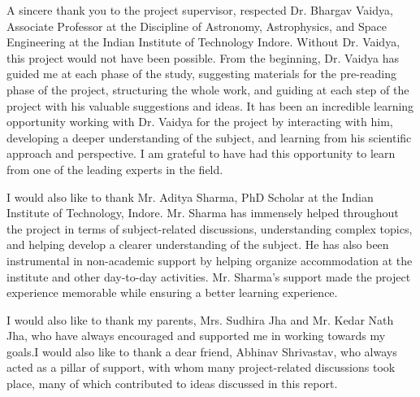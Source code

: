 \documentclass{article}
\begin{document}
A sincere thank you to the project supervisor, respected Dr. Bhargav Vaidya, Associate Professor at the Discipline of Astronomy, Astrophysics, and Space Engineering at the Indian Institute of Technology Indore. Without Dr. Vaidya, this project would not have been possible. From the beginning, Dr. Vaidya has guided me at each phase of the study, suggesting materials for the pre-reading phase of the project, structuring the whole work, and guiding at each step of the project with his valuable suggestions and ideas. It has been an incredible learning opportunity working with Dr. Vaidya for the project by interacting with him, developing a deeper understanding of the subject, and learning from his scientific approach and perspective. I am grateful to have had this opportunity to learn from one of the leading experts in the field.

I would also like to thank Mr. Aditya Sharma, PhD Scholar at the Indian Institute of Technology, Indore. Mr. Sharma has immensely helped throughout the project in terms of subject-related discussions, understanding complex topics, and helping develop a clearer understanding of the subject. He has also been instrumental in non-academic support by helping organize accommodation at the institute and other day-to-day activities. Mr. Sharma's support made the project experience memorable while ensuring a better learning experience.

I would also like to thank my parents, Mrs. Sudhira Jha and Mr. Kedar Nath Jha, who have always encouraged and supported me in working towards my goals.I would also like to thank a dear friend, Abhinav Shrivastav, who always acted as a pillar of support, with whom many project-related discussions took place, many of which contributed to ideas discussed in this report.
\end{document}
